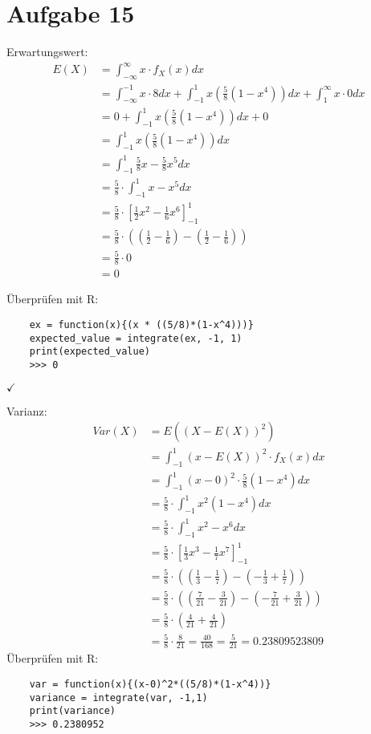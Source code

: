 \documentclass[a4paper]{scrartcl}
\begin{document}
\section*{Aufgabe 15}
Erwartungswert:\\
\begin{align*}
	E(X) & = \int_{-\infty}^{\infty} x \cdot f_X(x) dx\\
	& = \int_{-\infty}^{-1} x\cdot 8 dx + \int_{-1}^{1} x (\frac{5}{8}(1-x^4))dx + \int_{1}^{\infty}x \cdot 0 dx\\
	& = 0 + \int_{-1}^{1} x (\frac{5}{8}(1-x^4))dx  + 0\\
	& = \int_{-1}^{1} x(\frac{5}{8}(1-x^4))dx\\
	& = \int_{-1}^{1} \frac{5}{8}x - \frac{5}{8}x^5 dx\\
	& = \frac{5}{8} \cdot \int_{-1}^{1} x - x^5 dx\\
	& = \frac{5}{8} \cdot  \left[ \frac{1}{2}x^2 - \frac{1}{6} x^6\right]_{-1}^1\\
	& = \frac{5}{8} \cdot ((\frac{1}{2} - \frac{1}{6}) - (\frac{1}{2} - \frac{1}{6}))\\
	& = \frac{5}{8} \cdot 0\\
	& = 0
\end{align*}

Überprüfen mit R:\\
\begin{lstlisting}
	ex = function(x){(x * ((5/8)*(1-x^4)))}
	expected_value = integrate(ex, -1, 1)
	print(expected_value)
	>>> 0
\end{lstlisting}

$\checkmark$

Varianz:\\
\begin{align*}
	Var(X) & = E((X - E(X))^2)\\
	& = \int_{-1}^{1} (x - E(X))^2 \cdot f_X(x) dx\\
	& = \int_{-1}^{1} (x-0)^2 \cdot \frac{5}{8}(1-x^4) dx\\
	& = \frac{5}{8} \cdot \int_{-1}^{1} x^2(1-x^4) dx\\
	& = \frac{5}{8} \cdot \int_{-1}^{1} x^2 - x^6 dx\\
	& = \frac{5}{8} \cdot \left[\frac{1}{3}x^3 - \frac{1}{7}x^7\right]_{-1}^1\\
	& = \frac{5}{8} \cdot ((\frac{1}{3} - \frac{1}{7}) - (-\frac{1}{3} + \frac{1}{7}))\\
	& = \frac{5}{8} \cdot ((\frac{7}{21} - \frac{3}{21}) - (-\frac{7}{21} + \frac{3}{21}))\\
	& = \frac{5}{8} \cdot (\frac{4}{21} + \frac{4}{21})\\
	& = \frac{5}{8} \cdot \frac{8}{21} = \frac{40}{168} = \frac{5}{21} = 0.23809523809
\end{align*}
Überprüfen mit R:\\
\begin{lstlisting}
	var = function(x){(x-0)^2*((5/8)*(1-x^4))}
	variance = integrate(var, -1,1)
	print(variance)
	>>> 0.2380952
\end{lstlisting}
\end{document}
